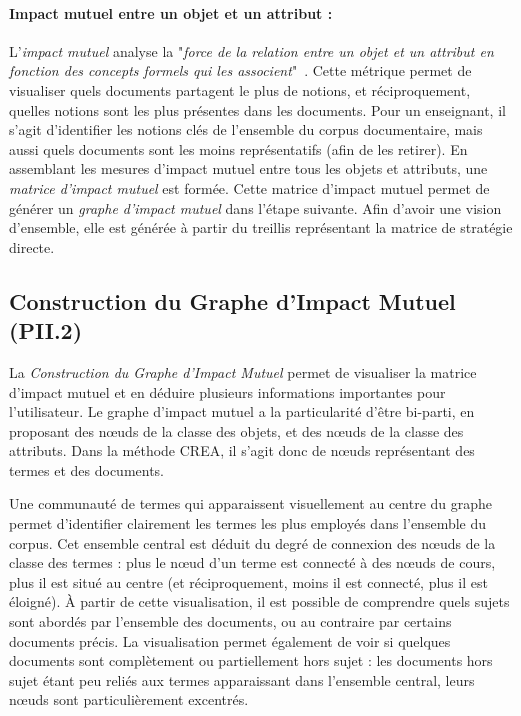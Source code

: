 \paragraph{Impact mutuel entre un objet et un attribut :}
\label{mystep:CREA:PII.1.e-metrique-impactmutuel}

L'\textit{impact mutuel} analyse la "\textit{force de la relation entre un objet et un attribut en fonction des concepts formels qui les associent}"~\cite{jaffal2019aide}.
Cette métrique permet de visualiser quels documents partagent le plus de notions, et réciproquement, quelles notions sont les plus présentes dans les documents.
Pour un enseignant, il s'agit d'identifier les notions clés de l'ensemble du corpus documentaire, mais aussi quels documents sont les moins représentatifs (afin de les retirer).
En assemblant les mesures d'impact mutuel entre tous les objets et attributs, une \textit{matrice d'impact mutuel} est formée.
Cette matrice d'impact mutuel permet de générer un \textit{graphe d'impact mutuel} dans l'étape suivante.
Afin d'avoir une vision d'ensemble, elle est générée à partir du treillis représentant la matrice de stratégie directe.


\subsection{Construction du Graphe d'Impact Mutuel (PII.2)}
\label{subsection:CREA:PII.2-GrapheImpactMutuel}

La \textit{Construction du Graphe d'Impact Mutuel} permet de visualiser la matrice d'impact mutuel et en déduire plusieurs informations importantes pour l'utilisateur.
Le graphe d'impact mutuel a la particularité d'être bi-parti, en proposant des n\oe{}uds de la classe des objets, et des n\oe{}uds de la classe des attributs.
Dans la méthode CREA, il s'agit donc de n\oe{}uds représentant des termes et des documents.

\bigskip

Une communauté de termes qui apparaissent visuellement au centre du graphe permet d'identifier clairement les termes les plus employés dans l'ensemble du corpus.
Cet ensemble central est déduit du degré de connexion des n\oe{}uds de la classe des termes : plus le n\oe{}ud d'un terme est connecté à des n\oe{}uds de cours, plus il est situé au centre (et réciproquement, moins il est connecté, plus il est éloigné).
À partir de cette visualisation, il est possible de comprendre quels sujets sont abordés par l'ensemble des documents, ou au contraire par certains documents précis.
La visualisation permet également de voir si quelques documents sont complètement ou partiellement hors sujet : les documents hors sujet étant peu reliés aux termes apparaissant dans l'ensemble central, leurs n\oe{}uds sont particulièrement excentrés.

